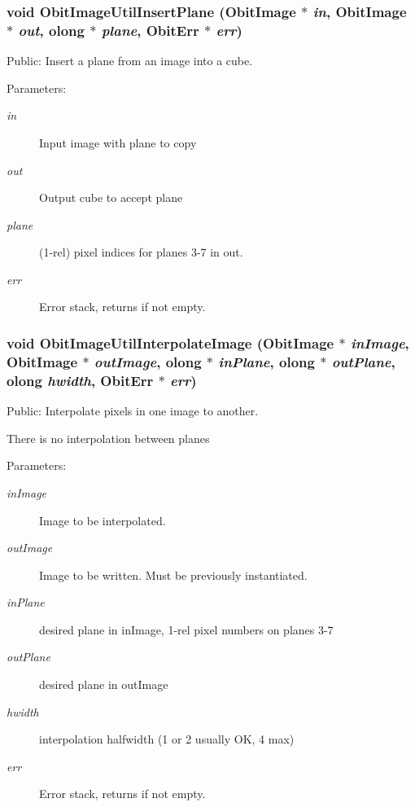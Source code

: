 \subsubsection{\setlength{\rightskip}{0pt plus 5cm}void Obit\-Image\-Util\-Insert\-Plane ({\bf Obit\-Image} $\ast$ {\em in}, {\bf Obit\-Image} $\ast$ {\em out}, {\bf olong} $\ast$ {\em plane}, {\bf Obit\-Err} $\ast$ {\em err})}\label{ObitImageUtil_8c_a19}


Public: Insert a plane from an image into a cube. 

\begin{Desc}
\item[Parameters:]
\begin{description}
\item[{\em in}]Input image with plane to copy \item[{\em out}]Output cube to accept plane \item[{\em plane}](1-rel) pixel indices for planes 3-7 in out. \item[{\em err}]Error stack, returns if not empty. \end{description}
\end{Desc}
\subsubsection{\setlength{\rightskip}{0pt plus 5cm}void Obit\-Image\-Util\-Interpolate\-Image ({\bf Obit\-Image} $\ast$ {\em in\-Image}, {\bf Obit\-Image} $\ast$ {\em out\-Image}, {\bf olong} $\ast$ {\em in\-Plane}, {\bf olong} $\ast$ {\em out\-Plane}, {\bf olong} {\em hwidth}, {\bf Obit\-Err} $\ast$ {\em err})}\label{ObitImageUtil_8c_a9}


Public: Interpolate pixels in one image to another. 

There is no interpolation between planes \begin{Desc}
\item[Parameters:]
\begin{description}
\item[{\em in\-Image}]Image to be interpolated. \item[{\em out\-Image}]Image to be written. Must be previously instantiated. \item[{\em in\-Plane}]desired plane in in\-Image, 1-rel pixel numbers on planes 3-7 \item[{\em out\-Plane}]desired plane in out\-Image \item[{\em hwidth}]interpolation halfwidth (1 or 2 usually OK, 4 max) \item[{\em err}]Error stack, returns if not empty. \end{description}
\end{Desc}
